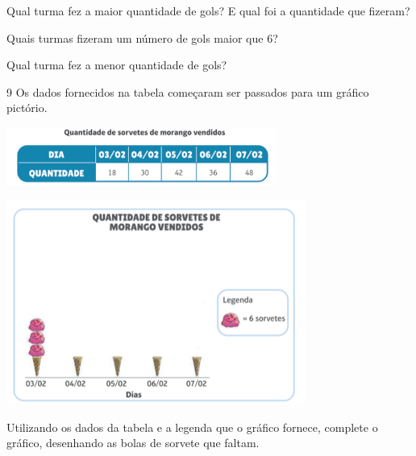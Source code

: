 \begin{escolha}
\item Qual turma fez a maior quantidade de gols? E qual foi a quantidade que fizeram?


\item Quais turmas fizeram um número de gols maior que 6?


\item Qual turma fez a menor quantidade de gols?

\end{escolha}

\num{9} Os dados fornecidos na tabela começaram ser passados para um
gráfico pictório.


\includegraphics[width=3.47436in,height=0.75022in]{./media/image98.png}

\includegraphics[width=3.86538in,height=2.63899in]{./media/image99.png}

Utilizando os dados da tabela e a legenda que o gráfico fornece,
complete o gráfico, desenhando as bolas de sorvete que faltam.


